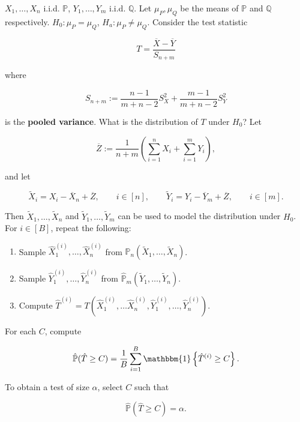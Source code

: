 \begin{example}

\(X_1, \ldots, X_n\) i.i.d. \(\mathbb{P}\), \(Y_1, \ldots, Y_m\) i.i.d. \(\mathbb{Q}\). Let \(\mu_P, \mu_Q\) be the means of \(\mathbb{P}\) and \(\mathbb{Q}\) respectively. \(H_0: \mu_P = \mu_Q\), \(H_a: \mu_P \neq \mu_Q\). Consider the test statistic

\[
T = \frac{\overline{X} - \overline{Y}}{S_{n+m}}
\]

where

\[
S_{n+m} := \frac{n-1}{m+n-2}S_X^2 + \frac{m-1}{m+n-2} S_Y^2
\]

is the \textbf{pooled variance}. What is the distribution of \(T\) under \(H_0\)? Let 

\[
\overline{Z} := \frac{1}{n+m} \left( \sum_{i=1}^n X_i + \sum_{i=1}^m Y_i\right),
\]

and let 

\[
\tilde{X}_i = X_i - \overline{X}_n + \overline{Z}, \qquad i \in [n], \qquad \tilde{Y}_i = Y_i - \overline{Y}_m + \overline{Z}, \qquad i \in [m].
\]

Then \(\tilde{X}_1, \ldots, \tilde{X}_n\) and \(\tilde{Y}_1, \ldots, \tilde{Y}_m\) can be used to model the distribution under \(H_0\). For \(i \in [B]\), repeat the following:

\begin{enumerate}

\item Sample \(\hat{X}_1^{(i)}, \ldots, \hat{X}_n^{(i)}\) from \(\hat{\mathbb{P}}_n(\tilde{X}_1, \ldots, \tilde{X}_n)\). 

\item Sample \(\hat{Y}_1^{(i)}, \ldots, \hat{Y}_n^{(i)}\) from \(\hat{\mathbb{P}}_m(\tilde{Y}_1, \ldots, \tilde{Y}_n)\). 

\item Compute \(\hat{T}^{(i)} = T( \hat{X}_1^{(i)}, \ldots \hat{X}_n^{(i)},  \hat{Y}_1^{(i)}, \ldots, \hat{Y}_n^{(i)})\). 



\end{enumerate}

For each \(C\), compute 

\[
\hat{\mathbb{P}}(\hat{T} \geq C) = \frac{1}{B} \sum_{i=1}^B \mathbbm{1} \left\{ \hat{T}^{(i)} \geq C \right\}.
\]

To obtain a test of size \(\alpha\), select \(C\) such that 

\[
\hat{\mathbb{P}}(\hat{T} \geq C) = \alpha.
\]

\end{example}

